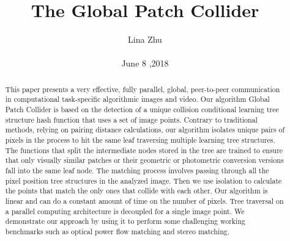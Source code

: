 \documentclass[10pt,twocolumn,letterpaper]{article}
\begin{document}
\title{The Global Patch Collider}

\author{Lina Zhu\\\\June 8 ,2018}
\maketitle
\begin{abstract}
This paper presents a very effective, fully parallel, global, peer-to-peer communication in computational task-specific algorithmic images and video. Our algorithm Global Patch Collider is based on the detection of a unique collision conditional learning tree structure hash function that uses a set of image points. Contrary to traditional methods, relying on pairing distance calculations, our algorithm isolates unique pairs of pixels in the process to hit the same leaf traversing multiple learning tree structures. The functions that split the intermediate nodes stored in the tree are trained to ensure that only visually similar patches or their geometric or photometric conversion versions fall into the same leaf node. The matching process involves passing through all the pixel position tree structures in the analyzed image. Then we use isolation to calculate the points that match the only ones that collide with each other. Our algorithm is linear and can do a constant amount of time on the number of pixels. Tree traversal on a parallel computing architecture is decoupled for a single image point. We demonstrate our approach by using it to perform some challenging working benchmarks such as optical power flow matching and stereo matching.
\end{abstract}
\end{document}
